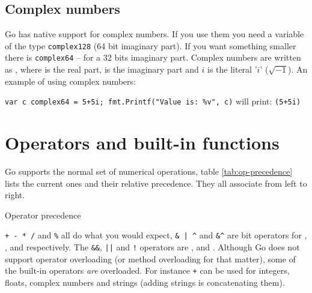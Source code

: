 \subsection{Complex numbers}
Go has native support for complex numbers. If you 
use them you need a variable of the type \lstinline{complex128} (64
bit imaginary part). If you
want something smaller there is \lstinline{complex64} -- for a 32 bits
imaginary part.
Complex numbers are written as
, where  is the real part,
 is the imaginary part and $i$ is the literal '$i$' ($\sqrt{-1}$).
An example of using complex numbers:

\lstinline{var c complex64 = 5+5i; fmt.Printf("Value is: %v", c)}\newline
will print: \lstinline{(5+5i)}

\section{Operators and built-in functions}
Go supports the normal set of numerical operations,
table \ref{tab:op-precedence}
lists the current ones and their relative precedence. They
all associate from left to right.

\begin{table}[H]
\begin{center}
\caption{Operator precedence}
\label{tab:op-precedence}

\end{center}
\end{table}
\verb|+ - * /| and \verb|%| all do what you would expect,
\verb!& | ^!
and \verb!&^! are bit operators for
, 
,  and  respectively.
The \verb|&&|, \verb/||/ and \verb|!| operators are 
,
 and
.
Although Go does not support operator overloading (or method
overloading for that matter), some of the built-in
operators \emph{are} overloaded. For instance \texttt{+} can be used for integers,
floats, complex numbers and strings (adding strings is concatenating
them).

